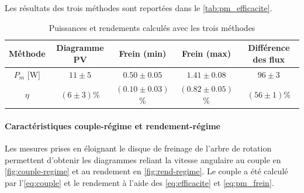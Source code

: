 Les résultats des trois méthodes sont reportées dans le \autoref{tab:pm_efficacite}.

\begin{table}[h]
    \centering
    \begin{tabulary}{\linewidth}{C C C C C}
        \toprule
        Méthode & Diagramme PV & Frein (min) & Frein (max) & Différence des flux \\
        \midrule
        \(P_m\) [\si{\watt}] & \(11 \pm 5\) & \(0.50 \pm 0.05\) & \(1.41 \pm 0.08\) & \(96 \pm 3\) \\
        \(\eta\) & \((6 \pm 3)\)\% & \((0.10 \pm 0.03)\)\% & \((0.82 \pm 0.05)\)\% & \((56 \pm 1)\)\% \\
        \bottomrule
    \end{tabulary}
    \caption{Puissances et rendements calculés avec les trois méthodes}
    \label{tab:pm_efficacite}
\end{table}

\paragraph*{Caractéristiques couple-régime et rendement-régime}
Les mesures prises en éloignant le disque de freinage de l'arbre de rotation permettent d'obtenir les diagrammes reliant la vitesse angulaire au couple en \autoref{fig:couple-regime} et au rendement en \autoref{fig:rend-regime}. Le couple a été calculé par l'\autoref{eq:couple} et le rendement à l'aide des \autoref{eq:efficacite} et \autoref{eq:pm_frein}.

